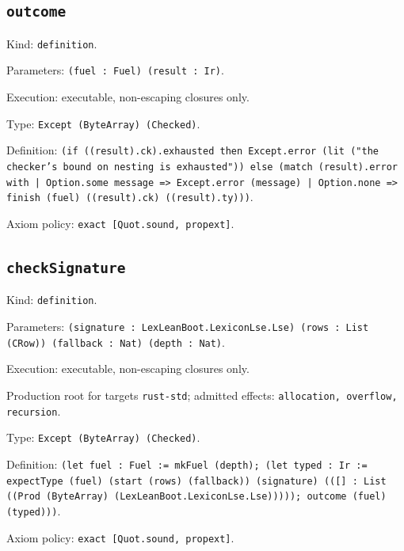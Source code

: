 \documentclass[11pt]{article}
\begin{document}
\subsection*{\texttt{outcome}}
\noindent Kind: \texttt{definition}.\par
\noindent Parameters: \texttt{(fuel : Fuel) (result : Ir)}.\par
\noindent Execution: executable, non-escaping closures only.\par
\noindent Type: \texttt{Except (ByteArray) (Checked)}.\par
\noindent Definition: \texttt{(if ((result).ck).exhausted then Except.error (lit ("the checker's bound on nesting is exhausted")) else (match (result).error with | Option.some message => Except.error (message) | Option.none => finish (fuel) ((result).ck) ((result).ty)))}.\par
\noindent Axiom policy: \texttt{exact [Quot.sound, propext]}.\par
\subsection*{\texttt{checkSignature}}
\noindent Kind: \texttt{definition}.\par
\noindent Parameters: \texttt{(signature : LexLeanBoot.LexiconLse.Lse) (rows : List (CRow)) (fallback : Nat) (depth : Nat)}.\par
\noindent Execution: executable, non-escaping closures only.\par
\noindent Production root for targets \texttt{rust-std}; admitted effects: \texttt{allocation, overflow, recursion}.\par
\noindent Type: \texttt{Except (ByteArray) (Checked)}.\par
\noindent Definition: \texttt{(let fuel : Fuel := mkFuel (depth); (let typed : Ir := expectType (fuel) (start (rows) (fallback)) (signature) (([] : List ((Prod (ByteArray) (LexLeanBoot.LexiconLse.Lse))))); outcome (fuel) (typed)))}.\par
\noindent Axiom policy: \texttt{exact [Quot.sound, propext]}.\par
\end{document}

